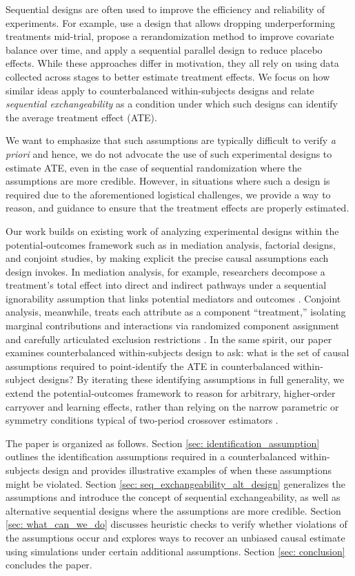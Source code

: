 Sequential designs are often used to improve the efficiency and reliability of experiments. For example, \cite{04_whitehead2020estimation} use a design that allows dropping underperforming treatments mid-trial, \cite{08_zhou2018sequential} propose a rerandomization method to improve covariate balance over time, and \cite{03_tamura2011estimation} apply a sequential parallel design to reduce placebo effects. While these approaches differ in motivation, they all rely on using data collected across stages to better estimate treatment effects. We focus on how similar ideas apply to counterbalanced within-subjects designs and relate \textit{sequential exchangeability} as a condition under which such designs can identify the average treatment effect (ATE).

We want to emphasize that such assumptions are typically difficult to verify \emph{a priori} and hence, we do not advocate the use of such experimental designs to estimate ATE, even in the case of sequential randomization where the assumptions are more credible. However, in situations where such a design is required due to the aforementioned logistical challenges, we provide a way to reason, and guidance to ensure that the treatment effects are properly estimated.

Our work builds on existing work of analyzing experimental designs within the potential‐outcomes framework such as in mediation analysis, factorial designs, and conjoint studies, by making explicit the precise causal assumptions each design invokes. In mediation analysis, for example, researchers decompose a treatment’s total effect into direct and indirect pathways under a sequential ignorability assumption that links potential mediators and outcomes \citep{imai2013experimental,11_imai2010general}. Conjoint analysis, meanwhile, treats each attribute as a component ``treatment,'' isolating marginal contributions and interactions via randomized component assignment and carefully articulated exclusion restrictions \citep{egami2019causal}. In the same spirit, our paper examines counterbalanced within-subjects design to ask: what is the set of causal assumptions required to point‐identify the ATE in counterbalanced within‐subject designs? By iterating these identifying assumptions in full generality, we extend the potential‐outcomes framework to reason for arbitrary, higher‐order carryover and learning effects, rather than relying on the narrow parametric or symmetry conditions typical of two‐period crossover estimators \citep{23_AnalysisOfCrossoverTrial}.

The paper is organized as follows. Section \ref{sec: identification_assumption} outlines the identification assumptions required in a counterbalanced within-subjects design and provides illustrative examples of when these assumptions might be violated. Section \ref{sec: seq_exchangeability_alt_design} generalizes the assumptions and introduce the concept of sequential exchangeability, as well as alternative sequential designs where the assumptions are more credible. Section \ref{sec: what_can_we_do} discusses heuristic checks to verify whether violations of the assumptions occur and explores ways to recover an unbiased causal estimate using simulations under certain additional assumptions. Section \ref{sec: conclusion} concludes the paper.